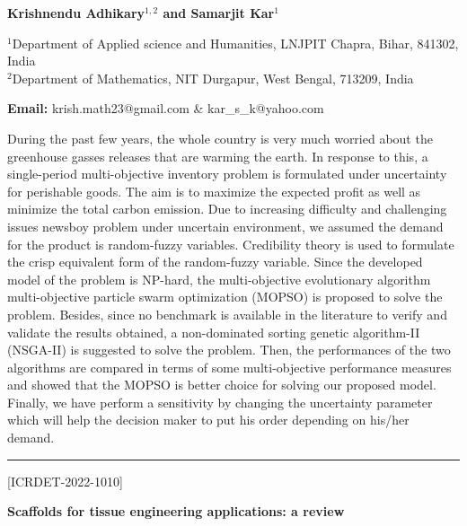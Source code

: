 \documentclass[twoside,11pt]{amsart}
\begin{document}
\centerline{\textbf{ Krishnendu Adhikary$^{1,2}$ and Samarjit Kar$^{1}$}}
\vskip 5mm
\begin{flushleft}
$^{1}$Department of Applied science and Humanities, LNJPIT Chapra, Bihar, 841302, India\\
$^{2}$Department of Mathematics, NIT Durgapur, West Bengal, 713209, India
\vskip 5mm
\end{flushleft}
\vskip 2mm
\begin{flushleft}
{\bf Email:} krish.math23@gmail.com \& kar_s_k@yahoo.com
\end{flushleft}
\vskip 5mm
During the past few years, the whole country is very much worried about the greenhouse gasses releases that are warming the earth. In response to this, a single-period multi-objective inventory problem is formulated under uncertainty for perishable goods. The aim is to maximize the expected profit as well as minimize the total carbon emission. Due to increasing difficulty and challenging issues newsboy problem under uncertain environment, we assumed the demand for the product is random-fuzzy variables.
\newpage
 Credibility theory is used to formulate the crisp equivalent form of the random-fuzzy variable. Since the developed model of the problem is NP-hard, the multi-objective evolutionary algorithm multi-objective particle swarm optimization (MOPSO) is proposed to solve the problem. Besides, since no benchmark is available in the literature to verify and validate the results obtained, a non-dominated sorting genetic algorithm-II (NSGA-II) is suggested to solve the problem. Then, the performances of the two algorithms are compared in terms of some multi-objective performance measures and showed that the MOPSO is better choice for solving our proposed model. Finally, we have perform a sensitivity by changing the uncertainty parameter which will help the decision maker to put his order depending on his/her demand.
\vskip 2mm
\rule{\textwidth}{0.5pt}
\vskip 2mm
\begin{flushleft}
\centerline{[ICRDET-2022-1010]}
\end{flushleft}
\begin{center}\bf\LARGE
Scaffolds for tissue engineering applications: a review
\end{center}
\vskip 2mm
\end{document}
